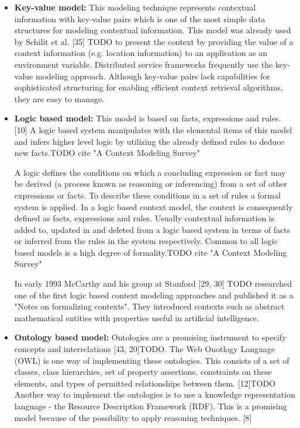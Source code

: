 \begin{itemize}
\item \textbf{Key-value model:}  This modeling technique represents contextual information with key-value pairs which is one of the most simple data structures for modeling contextual information. This model was already used by Schilit et al. [35] TODO to present the context by providing the value of a context information (e.g. location information) to an application as an environment variable. Distributed service frameworks  frequently use the key-value modeling approach. Although key-value pairs lack capabilities for sophisticated structuring for enabling efficient context retrieval algorithms, they are easy to manage.

\item \textbf{Logic based model: } This model is based on facts, expressions and rules. [10] A logic based system manipulates with the elemental items of this model and infers higher level logic by utilizing the already defined rules to deduce new facts.TODO cite "A Context Modeling Survey"

A logic defines the conditions on which a concluding expression or fact may be derived (a process known as reasoning or inferencing) from a set of other expressions or facts. To describe these conditions in a set of rules a formal system is applied. In a logic based context model, the context is consequently defined as facts, expressions and rules. Usually contextual information is added to, updated in and deleted from a logic based system in terms of facts or inferred from the rules in the system respectively. Common to all logic based models is a high degree of formality.TODO cite "A Context Modeling Survey"

In early 1993 McCarthy and his group at Stanford [29, 30] TODO researched one of the first logic based context modeling approaches and published it as a "Notes on formalizing contexts". They introduced contexts such as abstract mathematical entities with properties useful in artificial intelligence.


\item \textbf{Ontology based model: }
Ontologies are a promising instrument to specify concepts and interrelations [43, 20]TODO. The Web Onotlogy Language (OWL) is one way of implementing these ontologies. This consists of a set of classes, class hierarchies, set of property assertions, constraints on these elements, and types of permitted relationships between them. [12]TODO Another way to implement the ontologies is to use a knowledge representation language - the Resource Description Framework (RDF). This is a promising model because of the possibility to apply reasoning techniques. [8]  


\end{itemize}
